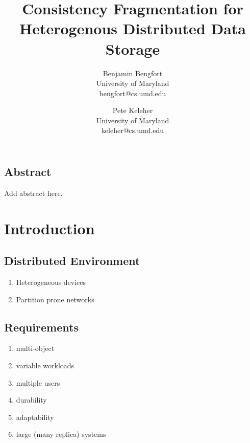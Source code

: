\documentclass[letterpaper,twocolumn,10pt]{article}
\begin{document}
\date{}

\title{\Large \bf Consistency Fragmentation for Heterogenous Distributed Data Storage}

\author{
{\rm Benjamin Bengfort}\\
University of Maryland\\
bengfort@cs.umd.edu
\and
{\rm Pete Keleher}\\
University of Maryland\\
keleher@cs.umd.edu
} %

\maketitle



\subsection*{Abstract}
Add abstract here.

\section{Introduction}


\subsection{Distributed Environment}

\begin{enumerate}
    \item Heterogeneous devices
    \item Partition prone networks
\end{enumerate}

\subsection{Requirements}

\begin{enumerate}
    \item multi-object
    \item variable workloads
    \item multiple users
    \item durability
    \item adaptability
    \item large (many replica) systems
\end{enumerate}
\end{document}
